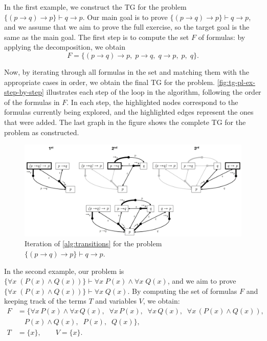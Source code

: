 \vspace{1em}
In the first example, we construct the \gls{TG} for the problem \(\{(p \to q) \to p\} \vdash q \to p\). Our main goal is to prove \(\{(p \to q) \to p\} \vdash q \to p\), and we assume that we aim to prove the full exercise, so the target goal is the same as the main goal. The first step is to compute the set \(F\) of formulas: by applying the decomposition, we obtain
\[
    F = \{(p \to q) \to p,\; p \to q,\; q \to p,\; p,\; q\}.
\]

Now, by iterating through all formulas in the set and matching them with the appropriate cases in order, we obtain the final \gls{TG} for the problem. 
\autoref{fig:tg-pl-ex-step-by-step} illustrates each step of the loop in the algorithm, following the order of the formulas in \(F\). 
In each step, the highlighted nodes correspond to the formulas currently being explored, and the highlighted edges represent the ones that were added. 
The last graph in the figure shows the complete \gls{TG} for the problem as constructed.

\begin{figure}[h]
    \centering
    \includegraphics[width=1\linewidth]{Chapters/Figures/tg-pl-ex-step-by-step.jpg}
    \caption{Iteration of \autoref{alg:transitions} for the problem \(\{(p \to q) \to p\} \vdash q \to p\).}
    \label{fig:tg-pl-ex-step-by-step}
\end{figure}

\vspace{1em}
In the second example, our problem is \(\{\forall x\;(P(x) \land Q(x))\} \vdash \forall x\;P(x) \land \forall x\;Q(x)\), and we aim to prove \(\{\forall x\;(P(x) \land Q(x))\} \vdash \forall x\;Q(x)\). By computing the set of formulas \(F\) and keeping track of the terms \(T\) and variables \(V\), we obtain:
\[
\begin{aligned}
F &= \bigl\{ \forall x\,P(x) \land \forall x\,Q(x),\;\; \forall x\,P(x),\;\; \forall x\,Q(x),\;\; \forall x\,(P(x) \land Q(x)),\\
&\quad P(x) \land Q(x),\;\; P(x),\;\; Q(x) \bigr\},\\[2mm]
T &= \{x\}, \qquad V = \{x\}.
\end{aligned}
\]


